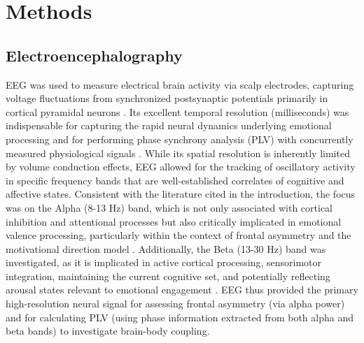 \section{Methods}

\subsection{Electroencephalography}
\gls{EEG} was used to measure electrical brain activity via scalp electrodes, capturing voltage fluctuations from synchronized postsynaptic potentials primarily in cortical pyramidal neurons \parencite{sharmaEmergingTrendsEEG2024, chaddadElectroencephalographySignalProcessing2023}. Its excellent temporal resolution (milliseconds) was indispensable for capturing the rapid neural dynamics underlying emotional processing and for performing phase synchrony analysis (\gls{PLV}) with concurrently measured physiological signals \parencite{cohenAnalyzingNeuralTime2014}. While its spatial resolution is inherently limited by volume conduction effects, \gls{EEG} allowed for the tracking of oscillatory activity in specific frequency bands that are well-established correlates of cognitive and affective states. Consistent with the literature cited in the introduction, the focus was on the Alpha (8-13 Hz) band, which is not only associated with cortical inhibition and attentional processes but also critically implicated in emotional valence processing, particularly within the context of frontal asymmetry and the motivational direction model \parencite{allenIssuesAssumptionsRoad2004, klimeschEEGAlphaTheta1999}. Additionally, the Beta (13-30 Hz) band was investigated, as it is implicated in active cortical processing, sensorimotor integration, maintaining the current cognitive set, and potentially reflecting arousal states relevant to emotional engagement \parencite{engelDynamicPredictionsOscillations2001, koenigMillisecondMillisecondYear2002}. \gls{EEG} thus provided the primary high-resolution neural signal for assessing frontal asymmetry (via alpha power) and for calculating \gls{PLV} (using phase information extracted from both alpha and beta bands) to investigate brain-body coupling.

